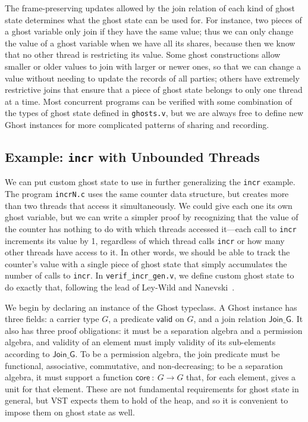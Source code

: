\documentclass[11pt]{article}
\begin{document}
The frame-preserving updates allowed by the join relation of each kind of ghost state determines what the ghost state can be used for. For instance, two pieces of a ghost variable only join if they have the same value; thus we can only change the value of a ghost variable when we have all its shares, because then we know that no other thread is restricting its value. Some ghost constructions allow smaller or older values to join with larger or newer ones, so that we can change a value without needing to update the records of all parties; others have extremely restrictive joins that ensure that a piece of ghost state belongs to only one thread at a time. Most concurrent programs can be verified with some combination of the types of ghost state defined in \texttt{ghosts.v}, but we are always free to define new \textsf{Ghost} instances for more complicated patterns of sharing and recording.

\subsection{Example: \texttt{incr} with Unbounded Threads}
\label{incr-gen}
We can put custom ghost state to use in further generalizing the \texttt{incr} example. The program \texttt{incrN.c} uses the same counter data structure, but creates more than two threads that access it simultaneously. We could give each one its own ghost variable, but we can write a simpler proof by recognizing that the value of the counter has nothing to do with which threads accessed it---each call to \texttt{incr} increments its value by 1, regardless of which thread calls \texttt{incr} or how many other threads have access to it. In other words, we should be able to track the counter's value with a single piece of ghost state that simply accumulates the number of calls to \texttt{incr}. In \texttt{verif\_incr\_gen.v}, we define custom ghost state to do exactly that, following the lead of Ley-Wild and Nanevski~\cite{subjective}.

We begin by declaring an instance of the \textsf{Ghost} typeclass. A \textsf{Ghost} instance has three fields: a carrier type $G$, a predicate $\mathsf{valid}$ on $G$, and a join relation $\mathsf{Join\_G}$. It also has three proof obligations: it must be a separation algebra and a permission algebra, and validity of an element must imply validity of its sub-elements according to $\mathsf{Join\_G}$. To be a permission algebra, the join predicate must be functional, associative, commutative, and non-decreasing; to be a separation algebra, it must support a function $\mathsf{core}\::\:G \rightarrow G$ that, for each element, gives a unit for that element. These are not fundamental requirements for ghost state in general, but VST expects them to hold of the heap, and so it is convenient to impose them on ghost state as well.
\end{document}
